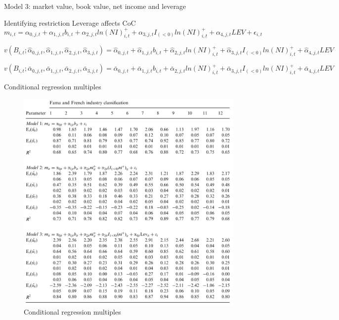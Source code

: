 \documentclass[aspectratio=169,xcolor=dvipsnames]{beamer}
\begin{document}
\begin{frame}{Model 3: market value, book value, net income and leverage}
    \begin{block}{Identifying restriction}
        Leverage affects CoC
        \begin{equation}
            m_{i,t} = \alpha_{0,j,t} + \alpha_{1,j,t} b_{i,t} + \alpha_{2,j,t} ln(NI)^{+}_{i,t} + \alpha_{3,j,t} I_{(<0)} ln(NI)^{+}_{i,t} + \alpha_{4,j,t} LEV + \epsilon_{i,t}
        \end{equation}

        \begin{equation}
            v(B_{i,t}; \hat{\alpha}_{0, j,t}, \hat{\alpha}_{1, j,t}, \hat{\alpha}_{2, j,t}, \hat{\alpha}_{3, j,t}) = \hat{\alpha}_{0, j,t} + \hat{\alpha}_{1, j,t} b_{i,t} + \hat{\alpha}_{2, j,t}ln(NI)^{+}_{i,t} + \hat{\alpha}_{3, j,t} I_{(<0)} ln(NI)^{+}_{i,t} + \hat{\alpha}_{4,j,t} LEV
        \end{equation}

        \begin{equation}
            v(B_{i,t}; \bar{\alpha}_{0, j,t}, \bar{\alpha}_{1, j,t}, \bar{\alpha}_{2, j,t}, \bar {\alpha}_{3, j,t}) = \bar {\alpha}_{0, j,t} + \bar {\alpha}_{1, j,t} b_{i,t} + \bar {\alpha}_{2, j,t}ln(NI)^{+}_{i,t} + \bar {\alpha}_{3, j,t} I_{(<0)} ln(NI)^{+}_{i,t} + \bar{\alpha}_{4,j,t} LEV
        \end{equation}
    \end{block}
\end{frame}

\begin{frame}{Conditional regression multiples}
    \begin{figure}
        \includegraphics[width=0.55\linewidth]{figures/p2_table4.png}
        \caption{Conditional regression multiples}
    \end{figure}
\end{frame}
\end{document}
